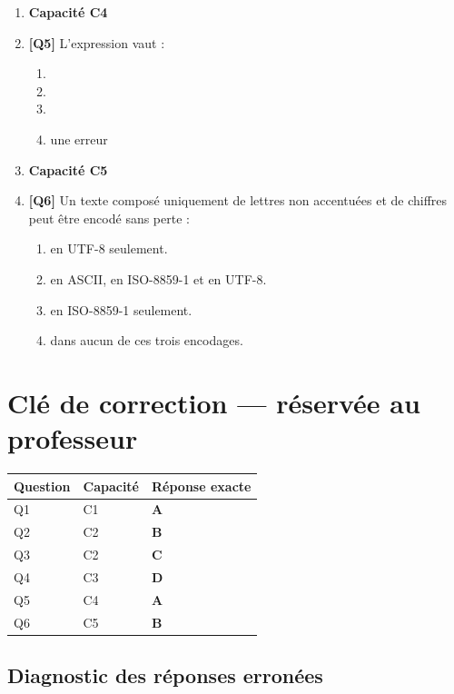 \begin{enumerate}
\item[] \textbf{Capacité C4}

\item \textbf{[Q5]} L'expression  vaut :
  \begin{enumerate}[label=\Alph*.]
    \item {}
    \item {}
    \item {}
    \item une erreur
  \end{enumerate}

\item[] \textbf{Capacité C5}

\item \textbf{[Q6]} Un texte composé uniquement de lettres non accentuées et de chiffres peut être encodé sans perte :
  \begin{enumerate}[label=\Alph*.]
    \item en UTF-8 seulement.
    \item en ASCII, en ISO-8859-1 et en UTF-8.
    \item en ISO-8859-1 seulement.
    \item dans aucun de ces trois encodages.
  \end{enumerate}

\end{enumerate}

\ifnxVersionProfesseur
\clearpage
\section*{Clé de correction — réservée au professeur}

\begin{center}
\begin{tabular}{lll}
\hline
Question & Capacité & Réponse exacte \\
\hline
Q1 & C1 & \textbf{A} \\
Q2 & C2 & \textbf{B} \\
Q3 & C2 & \textbf{C} \\
Q4 & C3 & \textbf{D} \\
Q5 & C4 & \textbf{A} \\
Q6 & C5 & \textbf{B} \\
\hline
\end{tabular}
\end{center}

\subsection*{Diagnostic des réponses erronées}

